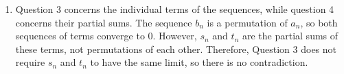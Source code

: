 \documentclass[12pt]{article}
\begin{document}
\begin{enumerate}
          \[
              t_{3m+2}
              =
              t_{3m}
              +\frac1{4m+1}
              +\frac1{4m+3}.
          \]Hence,
          \[
              \begin{aligned}
                  \left|t_{3m+2}-\frac{3S}{2}\right|
                   & \le
                  \left|t_{3m}-\frac{3S}{2}\right|
                  +\frac1{4m+1}
                  +\frac1{4m+3}                         \\
                   & <
                  \frac{\epsilon}{2}+\frac{\epsilon}{2} \\
                   & =\epsilon.
              \end{aligned}
          \]Thus, for every \(n\ge3M\),
          \[
              \left|t_n-\frac{3S}{2}\right|<\epsilon.
          \]Therefore,
          \[
              t_n\to\frac{3S}{2}.
          \]
    \item [(d)]
          Question 3 concerns the individual terms of the sequences,
          while question 4 concerns their partial sums.
          The sequence \(b_n\) is a permutation of \(a_n\),
          so both sequences of terms converge to \(0\).
          However, \(s_n\) and \(t_n\) are the partial sums of these terms,
          not permutations of each other.
          Therefore, Question 3 does not require \(s_n\) and \(t_n\) to have the same limit,
          so there is no contradiction.

\end{enumerate}
\end{document}
